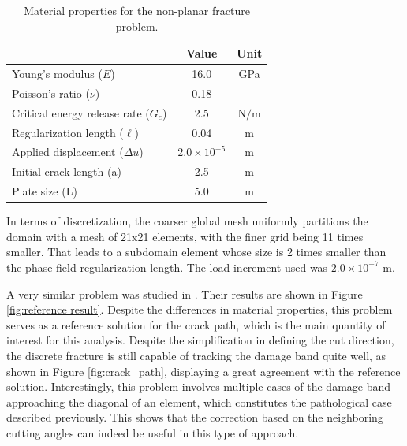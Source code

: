 \begin{table}[h]
    \centering
    \caption{Material properties for the non-planar fracture problem.}
    \begin{tabular}[t]{lcc}
    \hline
    &Value &Unit \\
    \hline
    Young's modulus ($E$)&16.0&GPa\\
    Poisson's ratio ($\nu$)&0.18&--\\
    Critical energy release rate ($G_c$)&2.5&$\text{N/m}$\\
    Regularization length ($\ell$)&0.04&$\text{m}$\\
    Applied displacement ($\Delta u$)&$2.0\times 10^{-5}$&$\text{m}$\\
    Initial crack length (a)&2.5&$\text{m}$\\
    Plate size (L)&5.0&$\text{m}$\\
    \hline
    \end{tabular}
    \label{material properties nonplanar}
\end{table}%

In terms of discretization, the coarser global mesh uniformly partitions the domain with a mesh of 21x21 elements, with the finer grid being 11 times smaller. That leads to a subdomain element whose size is 2 times smaller than the phase-field regularization length. The load increment used was $2.0\times 10^{-7}$ m. 

A very similar problem was studied in \cite{giovanardi2017hybrid}. Their results are shown in Figure \ref{fig:reference result}.  Despite the differences in material properties, this problem serves as a reference solution for the crack path, which is the main quantity of interest for this analysis. Despite the simplification in defining the cut direction, the discrete fracture is still capable of tracking the damage band quite well, as shown in Figure \ref{fig:crack_path}, displaying a great agreement with the reference solution. Interestingly, this problem involves multiple cases of the damage band approaching the diagonal of an element, which constitutes the pathological case described previously. This shows that the correction based on the neighboring cutting angles can indeed be useful in this type of approach.


